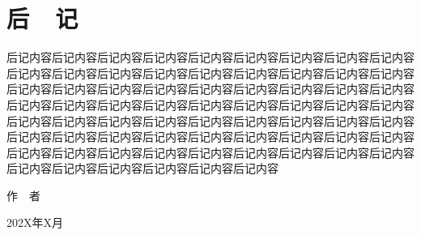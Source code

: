\documentclass[openany,twoside,12pt]{book}
\theoremstyle{plain}
\begin{document}
\chapter{后~~记}

后记内容后记内容后记内容后记内容后记内容后记内容后记内容后记内容后记内容后记内容后记内容后记内容后记内容后记内容后记内容后记内容后记内容后记内容后记内容后记内容后记内容后记内容后记内容后记内容后记内容后记内容后记内容后记内容后记内容后记内容后记内容后记内容后记内容后记内容后记内容后记内容后记内容后记内容后记内容后记内容后记内容后记内容后记内容后记内容后记内容后记内容后记内容后记内容后记内容后记内容后记内容后记内容后记内容后记内容后记内容后记内容后记内容后记内容后记内容后记内容后记内容后记内容后记内容后记内容后记内容后记内容后记内容后记内容后记内容


\vspace{5ex}
\begin{flushright}
作~~者~~~~~~~~~

202X年X月~~~~~
\end{flushright}
\end{document}
